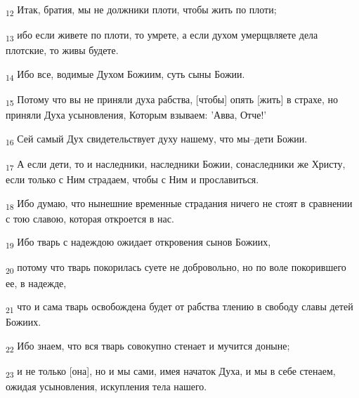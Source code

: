 \begin{tcolorbox}
\textsubscript{12} Итак, братия, мы не должники плоти, чтобы жить по плоти;
\end{tcolorbox}
\begin{tcolorbox}
\textsubscript{13} ибо если живете по плоти, то умрете, а если духом умерщвляете дела плотские, то живы будете.
\end{tcolorbox}
\begin{tcolorbox}
\textsubscript{14} Ибо все, водимые Духом Божиим, суть сыны Божии.
\end{tcolorbox}
\begin{tcolorbox}
\textsubscript{15} Потому что вы не приняли духа рабства, [чтобы] опять [жить] в страхе, но приняли Духа усыновления, Которым взываем: 'Авва, Отче!'
\end{tcolorbox}
\begin{tcolorbox}
\textsubscript{16} Сей самый Дух свидетельствует духу нашему, что мы--дети Божии.
\end{tcolorbox}
\begin{tcolorbox}
\textsubscript{17} А если дети, то и наследники, наследники Божии, сонаследники же Христу, если только с Ним страдаем, чтобы с Ним и прославиться.
\end{tcolorbox}
\begin{tcolorbox}
\textsubscript{18} Ибо думаю, что нынешние временные страдания ничего не стоят в сравнении с тою славою, которая откроется в нас.
\end{tcolorbox}
\begin{tcolorbox}
\textsubscript{19} Ибо тварь с надеждою ожидает откровения сынов Божиих,
\end{tcolorbox}
\begin{tcolorbox}
\textsubscript{20} потому что тварь покорилась суете не добровольно, но по воле покорившего ее, в надежде,
\end{tcolorbox}
\begin{tcolorbox}
\textsubscript{21} что и сама тварь освобождена будет от рабства тлению в свободу славы детей Божиих.
\end{tcolorbox}
\begin{tcolorbox}
\textsubscript{22} Ибо знаем, что вся тварь совокупно стенает и мучится доныне;
\end{tcolorbox}
\begin{tcolorbox}
\textsubscript{23} и не только [она], но и мы сами, имея начаток Духа, и мы в себе стенаем, ожидая усыновления, искупления тела нашего.
\end{tcolorbox}
